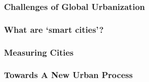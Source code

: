 \subsubsection*{Challenges of Global Urbanization}
\begin{bibunit}[unsrt]
\nocite{*}
\end{bibunit}
\subsubsection*{What are `smart cities'?}
\begin{bibunit}[unsrt]
\nocite{*}
\end{bibunit}
\subsubsection*{Measuring Cities}
\begin{bibunit}[unsrt]
\nocite{*}
\end{bibunit}
\subsubsection*{Towards A New Urban Process}
\begin{bibunit}[unsrt]
\nocite{*}
\end{bibunit}